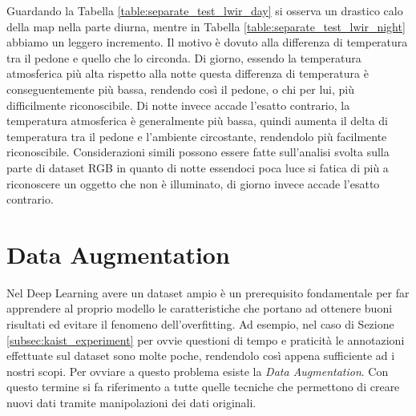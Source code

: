 \begin{table}[]
    \centering
    \caption{Risultati della valutazione separata}
    \label{table:separate_test_lwir_kaist}
\end{table}
Guardando la Tabella \ref{table:separate_test_lwir_day} si osserva un drastico calo della \ac{map} nella parte diurna, mentre in Tabella \ref{table:separate_test_lwir_night} abbiamo un leggero incremento. Il motivo è dovuto alla differenza di temperatura tra il pedone e quello che lo circonda. Di giorno, essendo la temperatura atmosferica più alta rispetto alla notte questa differenza di temperatura è conseguentemente più bassa, rendendo così il pedone, o chi per lui, più difficilmente riconoscibile. Di notte invece accade l'esatto contrario, la temperatura atmosferica è generalmente più bassa, quindi aumenta il delta di temperatura tra il pedone e l'ambiente circostante, rendendolo più facilmente riconoscibile. Considerazioni simili possono essere fatte sull'analisi svolta sulla parte di dataset RGB in quanto di notte essendoci poca luce si fatica di più a riconoscere un oggetto che non è illuminato, di giorno invece accade l'esatto contrario.



\section{Data Augmentation}
\label{sec:data_augmentation}
Nel Deep Learning avere un dataset ampio è un prerequisito fondamentale per far apprendere al proprio modello le caratteristiche che portano ad ottenere buoni risultati ed evitare il fenomeno dell'overfitting. Ad esempio, nel caso di Sezione \ref{subsec:kaist_experiment} per ovvie questioni di tempo e praticità le annotazioni effettuate sul dataset sono molte poche, rendendolo così appena sufficiente ad i nostri scopi. Per ovviare a questo problema esiste la \textit{Data Augmentation}. Con questo termine si fa riferimento a tutte quelle tecniche che permettono di creare nuovi dati tramite manipolazioni dei dati originali. 


